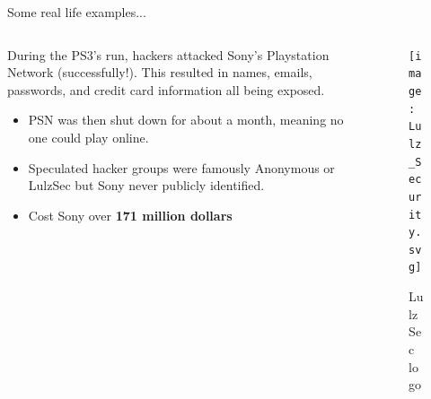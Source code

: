 \documentclass{beamer}
\begin{document}
\begin{frame}{Some real life examples...}
	\begin{columns}
		\begin{column}{0.5\textwidth}
			During the PS3's run, hackers attacked Sony's
			Playstation Network (successfully!). This resulted in
			names, emails, passwords, and credit card information
			all being exposed.
			\pause

			\begin{itemize}
				\item PSN was then shut down for about a month,
					meaning no one could play online.
					\pause

				\item Speculated hacker groups were famously
					Anonymous or LulzSec but Sony never
					publicly identified.
					\pause

				\item Cost Sony over \textbf{171 million
					dollars}
			\end{itemize}
		\end{column}
		\begin{column}{0.5\textwidth}
			\begin{figure}
				\centering
				\texttt{[image: Lulz\_Security.svg]}
				\caption{LulzSec logo}
			\end{figure}
		\end{column}
	\end{columns}
\end{frame}
\end{document}
